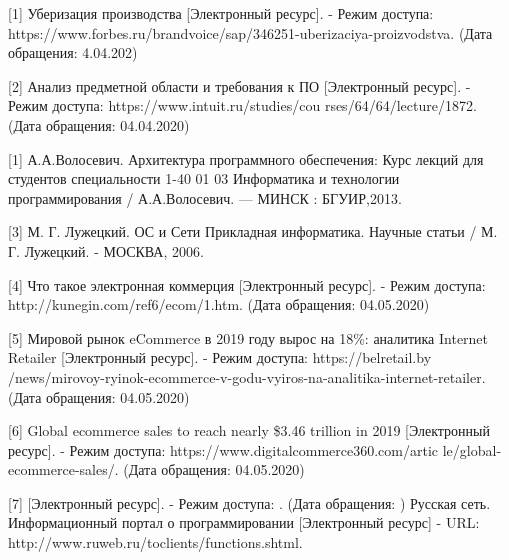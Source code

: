 



[1] Уберизация производства [Электронный ресурс]. - Режим доступа: https://www.forbes.ru/brandvoice/sap/346251-uberizaciya-proizvodstva. (Дата обращения: 4.04.202)

[2] Анализ предметной области и требования к ПО [Электронный ресурс]. - Режим доступа: https://www.intuit.ru/studies/cou  \linebreak rses/64/64/lecture/1872. (Дата обращения: 04.04.2020)

[1] А.А.Волосевич. Архитектура программного обеспечения: Курс лекций для студентов специальности 1-40 01 03 Информатика и технологии программирования / А.А.Волосевич. — МИНСК : БГУИР,2013.

[3] М. Г. Лужецкий. ОС и Сети Прикладная информатика. Научные статьи /  М. Г. Лужецкий. - МОСКВА, 2006.

[4] Что такое электронная коммерция [Электронный ресурс]. - Режим доступа: http://kunegin.com/ref6/ecom/1.htm. (Дата обращения: 04.05.2020)

[5] Мировой рынок eCommerce в 2019 году вырос на 18\%: аналитика Internet Retailer [Электронный ресурс]. - Режим доступа: https://belretail.by \linebreak/news/mirovoy-ryinok-ecommerce-v-godu-vyiros-na-analitika-internet-retailer. \linebreak (Дата обращения: 04.05.2020)

[6] Global ecommerce sales to reach nearly \$3.46 trillion in 2019 [Электронный ресурс]. - Режим доступа: https://www.digitalcommerce360.com/artic \linebreak le/global-ecommerce-sales/. (Дата обращения: 04.05.2020)

[7] [Электронный ресурс]. - Режим доступа: . (Дата обращения: )
Русская сеть. Информационный портал о программировании [Электронный ресурс] - URL: http://www.ruweb.ru/toclients/functions.shtml.

